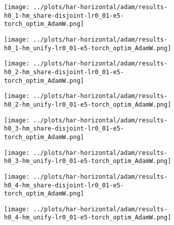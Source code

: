 \begin{figure}[htbp]  %
    \centering
    \begin{subfigure}[b]{0.47\textwidth}
        \centering
        \texttt{[image: ../plots/har-horizontal/adam/results-h0\_1-hm\_share-disjoint-lr0\_01-e5-torch\_optim\_AdamW.png]}
    \end{subfigure}
    \hfill
    \begin{subfigure}[b]{0.47\textwidth}
        \centering
        \texttt{[image: ../plots/har-horizontal/adam/results-h0\_1-hm\_unify-lr0\_01-e5-torch\_optim\_AdamW.png]}
    \end{subfigure}
\end{figure}
\begin{figure}[htbp]  %
    \centering
    \begin{subfigure}[b]{0.47\textwidth}
        \centering
        \texttt{[image: ../plots/har-horizontal/adam/results-h0\_2-hm\_share-disjoint-lr0\_01-e5-torch\_optim\_AdamW.png]}
    \end{subfigure}
    \hfill
    \begin{subfigure}[b]{0.47\textwidth}
        \centering
        \texttt{[image: ../plots/har-horizontal/adam/results-h0\_2-hm\_unify-lr0\_01-e5-torch\_optim\_AdamW.png]}
    \end{subfigure}
\end{figure}
\begin{figure}[htbp]  %
    \centering
    \begin{subfigure}[b]{0.47\textwidth}
        \centering
        \texttt{[image: ../plots/har-horizontal/adam/results-h0\_3-hm\_share-disjoint-lr0\_01-e5-torch\_optim\_AdamW.png]}
    \end{subfigure}
    \hfill
    \begin{subfigure}[b]{0.47\textwidth}
        \centering
        \texttt{[image: ../plots/har-horizontal/adam/results-h0\_3-hm\_unify-lr0\_01-e5-torch\_optim\_AdamW.png]}
    \end{subfigure}
\end{figure}
\begin{figure}[htbp]  %
    \centering
    \begin{subfigure}[b]{0.47\textwidth}
        \centering
        \texttt{[image: ../plots/har-horizontal/adam/results-h0\_4-hm\_share-disjoint-lr0\_01-e5-torch\_optim\_AdamW.png]}
    \end{subfigure}
    \hfill
    \begin{subfigure}[b]{0.47\textwidth}
        \centering
        \texttt{[image: ../plots/har-horizontal/adam/results-h0\_4-hm\_unify-lr0\_01-e5-torch\_optim\_AdamW.png]}
    \end{subfigure}
\end{figure}
